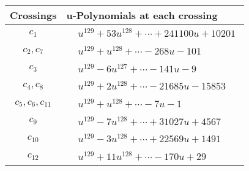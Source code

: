 \documentclass[1p]{elsarticle_modified}
\theoremstyle{definition}
\begin{document}
\begin{tabular}{m{50pt}|m{274pt}}
Crossings & \hspace{64pt}u-Polynomials at each crossing \\
\hline $$\begin{aligned}c_{1}\end{aligned}$$&$\begin{aligned}
&u^{129}+53 u^{128}+\cdots+241100 u+10201
\end{aligned}$\\
\hline $$\begin{aligned}c_{2},c_{7}\end{aligned}$$&$\begin{aligned}
&u^{129}+u^{128}+\cdots-268 u-101
\end{aligned}$\\
\hline $$\begin{aligned}c_{3}\end{aligned}$$&$\begin{aligned}
&u^{129}-6 u^{127}+\cdots-141 u-9
\end{aligned}$\\
\hline $$\begin{aligned}c_{4},c_{8}\end{aligned}$$&$\begin{aligned}
&u^{129}+2 u^{128}+\cdots-21685 u-15853
\end{aligned}$\\
\hline $$\begin{aligned}c_{5},c_{6},c_{11}\end{aligned}$$&$\begin{aligned}
&u^{129}+u^{128}+\cdots-7 u-1
\end{aligned}$\\
\hline $$\begin{aligned}c_{9}\end{aligned}$$&$\begin{aligned}
&u^{129}-7 u^{128}+\cdots+31027 u+4567
\end{aligned}$\\
\hline $$\begin{aligned}c_{10}\end{aligned}$$&$\begin{aligned}
&u^{129}-3 u^{128}+\cdots+22569 u+1491
\end{aligned}$\\
\hline $$\begin{aligned}c_{12}\end{aligned}$$&$\begin{aligned}
&u^{129}+11 u^{128}+\cdots-170 u+29
\end{aligned}$\\
\hline
\end{tabular}\\~\\
\end{document}
